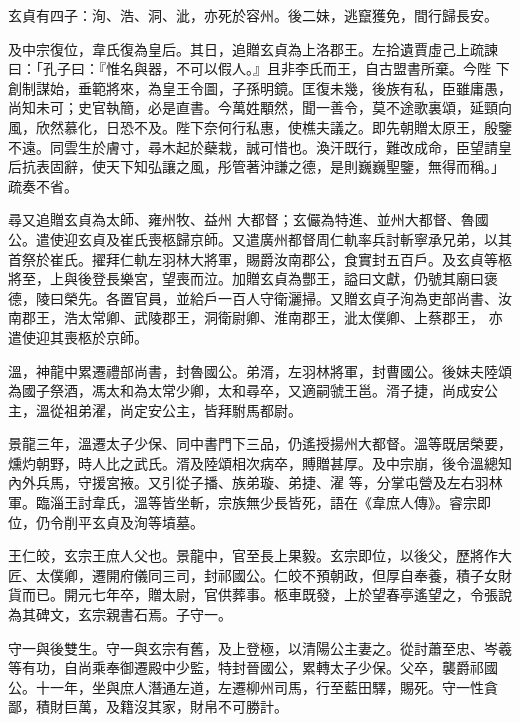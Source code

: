 \begin{pinyinscope}
 玄貞有四子：洵、浩、洞、泚，亦死於容州。後二妹，逃竄獲免，間行歸長安。



 及中宗復位，韋氏復為皇后。其日，追贈玄貞為上洛郡王。左拾遺賈虛己上疏諫曰：「孔子曰：『惟名與器，不可以假人。』且非李氏而王，自古盟書所棄。今陛
 下創制謀始，垂範將來，為皇王令圖，子孫明鏡。匡復未幾，後族有私，臣雖庸愚，尚知未可；史官執簡，必是直書。今萬姓顒然，聞一善令，莫不途歌裏頌，延頸向風，欣然慕化，日恐不及。陛下奈何行私惠，使樵夫議之。即先朝贈太原王，殷鑒不遠。同雲生於膚寸，尋木起於蘗栽，誠可惜也。渙汗既行，難改成命，臣望請皇后抗表固辭，使天下知弘讓之風，彤管著沖謙之德，是則巍巍聖鑒，無得而稱。」疏奏不省。



 尋又追贈玄貞為太師、雍州牧、益州
 大都督；玄儼為特進、並州大都督、魯國公。遣使迎玄貞及崔氏喪柩歸京師。又遣廣州都督周仁軌率兵討斬寧承兄弟，以其首祭於崔氏。擢拜仁軌左羽林大將軍，賜爵汝南郡公，食實封五百戶。及玄貞等柩將至，上與後登長樂宮，望喪而泣。加贈玄貞為酆王，謚曰文獻，仍號其廟曰褒德，陵曰榮先。各置官員，並給戶一百人守衛灑掃。又贈玄貞子洵為吏部尚書、汝南郡王，浩太常卿、武陵郡王，洞衛尉卿、淮南郡王，泚太僕卿、上蔡郡王，
 亦遣使迎其喪柩於京師。



 溫，神龍中累遷禮部尚書，封魯國公。弟湑，左羽林將軍，封曹國公。後妹夫陸頌為國子祭酒，馮太和為太常少卿，太和尋卒，又適嗣虢王邕。湑子捷，尚成安公主，溫從祖弟濯，尚定安公主，皆拜駙馬都尉。



 景龍三年，溫遷太子少保、同中書門下三品，仍遙授揚州大都督。溫等既居榮要，燻灼朝野，時人比之武氏。湑及陸頌相次病卒，賻贈甚厚。及中宗崩，後令溫總知內外兵馬，守援宮掖。又引從子播、族弟璇、弟捷、濯
 等，分掌屯營及左右羽林軍。臨淄王討韋氏，溫等皆坐斬，宗族無少長皆死，語在《韋庶人傳》。睿宗即位，仍令削平玄貞及洵等墳墓。



 王仁皎，玄宗王庶人父也。景龍中，官至長上果毅。玄宗即位，以後父，歷將作大匠、太僕卿，遷開府儀同三司，封祁國公。仁皎不預朝政，但厚自奉養，積子女財貨而已。開元七年卒，贈太尉，官供葬事。柩車既發，上於望春亭遙望之，令張說為其碑文，玄宗親書石焉。子守一。



 守一與後雙生。守一與玄宗有舊，及上登極，以清陽公主妻之。從討蕭至忠、岑羲等有功，自尚乘奉御遷殿中少監，特封晉國公，累轉太子少保。父卒，襲爵祁國公。十一年，坐與庶人潛通左道，左遷柳州司馬，行至藍田驛，賜死。守一性貪鄙，積財巨萬，及籍沒其家，財帛不可勝計。




\end{pinyinscope}
